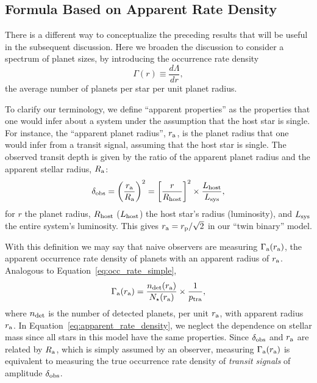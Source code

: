 \documentclass[12pt,modern]{aastex61}
\renewcommand{\a}{_{\rm a}}
\newcommand{\p}{_{\rm p}}
\begin{document}
\subsection{Formula Based on Apparent Rate Density}
\label{sec:model_1_density}

There is a different way to conceptualize the preceding results that
will be useful in the subsequent discussion.  Here we broaden the
discussion to consider a spectrum of planet sizes, by introducing the
occurrence rate density
\begin{equation}
    \Gamma(r) \equiv \frac{d\Lambda}{dr},
\end{equation}
the average number of planets per star per unit planet radius.

To clarify our terminology, we define ``apparent properties'' as the
properties that one would infer about a system under the assumption
that the host star is single. For instance, the  ``apparent planet
radius'', $r\a$, is the planet radius that one would infer from a
transit signal, assuming that the host star is single.  The observed
transit depth is given by the ratio of the apparent planet radius and
the apparent stellar radius, $R\a$:
\begin{equation}
  \delta_{\rm obs}
  = \left(\frac{r\a}{R\a}\right)^2
  = \left[{r\over R_{\rm host}}\right]^2\times {L_{\rm host} \over
          L_{\rm sys}},
  \label{eq:delta_obs_general} 
\end{equation}
for $r$ the planet radius, $R_{\rm host}$ ($L_{\rm host}$) the host
star's radius (luminosity), and $L_{\rm sys}$ the entire system's
luminosity. This gives $r\a=r\p/\sqrt{2}$ in our ``twin binary''
model.

With this definition we may say that naive observers are measuring
$\Gamma\a(r\a)$, the apparent occurrence rate density of planets with
an apparent radius of $r\a$.  Analogous to
Equation~\ref{eq:occ_rate_simple},  
\begin{equation}
  \Gamma\a(r\a) = \frac{n_{\rm det}(r\a)}{N_\star(r\a)}
      \times \frac{1}{p_{\rm tra}},
\label{eq:apparent_rate_density}
\end{equation}
where $n_{\rm det}$ is the number of detected planets, per unit $r\a$,
with apparent radius $r\a$.  In
Equation~\ref{eq:apparent_rate_density}, we neglect the dependence on
stellar mass since all stars in this model have the same properties.
Since $\delta_{\rm obs}$ and $r\a$ are related by $R\a$, which is
simply assumed by an observer, measuring $\Gamma\a(r\a)$ is equivalent
to measuring the true occurrence rate density of {\it transit signals}
of amplitude $\delta_{\rm obs}$.
\end{document}
